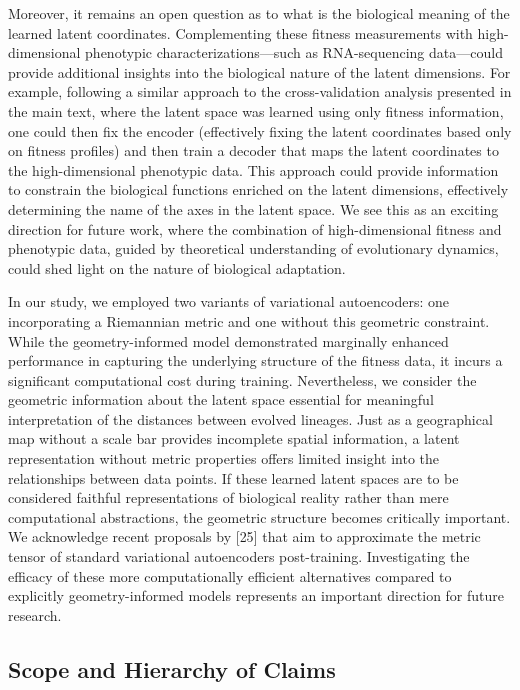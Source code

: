 \documentclass[
]{scrartcl}
\begin{document}
\begin{refsegment}
Moreover, it remains an open question as to what is the biological
meaning of the learned latent coordinates. Complementing these fitness
measurements with high-dimensional phenotypic characterizations---such
as RNA-sequencing data---could provide additional insights into the
biological nature of the latent dimensions. For example, following a
similar approach to the cross-validation analysis presented in the main
text, where the latent space was learned using only fitness information,
one could then fix the encoder (effectively fixing the latent
coordinates based only on fitness profiles) and then train a decoder
that maps the latent coordinates to the high-dimensional phenotypic
data. This approach could provide information to constrain the
biological functions enriched on the latent dimensions, effectively
determining the name of the axes in the latent space. We see this as an
exciting direction for future work, where the combination of
high-dimensional fitness and phenotypic data, guided by theoretical
understanding of evolutionary dynamics, could shed light on the nature
of biological adaptation.

In our study, we employed two variants of variational autoencoders: one
incorporating a Riemannian metric and one without this geometric
constraint. While the geometry-informed model demonstrated marginally
enhanced performance in capturing the underlying structure of the
fitness data, it incurs a significant computational cost during
training. Nevertheless, we consider the geometric information about the
latent space essential for meaningful interpretation of the distances
between evolved lineages. Just as a geographical map without a scale bar
provides incomplete spatial information, a latent representation without
metric properties offers limited insight into the relationships between
data points. If these learned latent spaces are to be considered
faithful representations of biological reality rather than mere
computational abstractions, the geometric structure becomes critically
important. We acknowledge recent proposals by {[}25{]} that aim to
approximate the metric tensor of standard variational autoencoders
post-training. Investigating the efficacy of these more computationally
efficient alternatives compared to explicitly geometry-informed models
represents an important direction for future research.

\subsection*{Scope and Hierarchy of
Claims}\label{scope-and-hierarchy-of-claims}


\end{refsegment}
\end{document}
